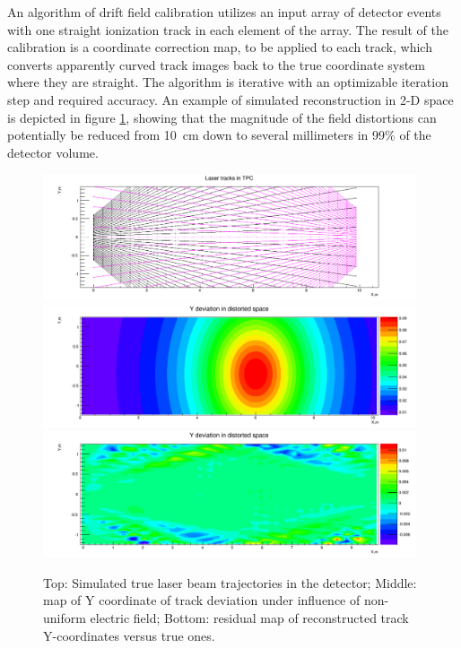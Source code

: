 An algorithm of drift field calibration utilizes an input array of detector events with one straight ionization track in each element of the array. The result of the calibration is a coordinate correction map, to be applied to each track, which converts apparently curved track images back to the true coordinate system where they are straight. The algorithm is iterative with an optimizable iteration step and required accuracy. An example of simulated reconstruction in 2-D space is depicted in figure \ref{Reco}, showing that the magnitude of the field distortions can potentially be reduced from 10~cm down to several millimeters in 99\% of the detector volume.


\begin{figure}
\centering	
\includegraphics[width=0.98\textwidth]{figures/Original_Tracks.pdf}
\includegraphics[width=0.98\textwidth]{figures/Ydev.pdf}
\includegraphics[width=0.98\textwidth]{figures/Yresidual.pdf}
\caption{Top: Simulated true laser beam trajectories in the detector; Middle: map of Y coordinate of track deviation under influence of non-uniform electric field; Bottom: residual map of reconstructed track Y-coordinates versus true ones.} 
\label{Reco}
\end{figure}



